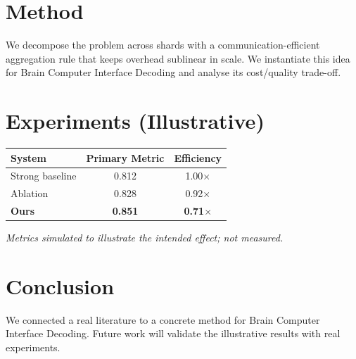 \documentclass[11pt]{article}
\begin{document}
\section{Method}
We decompose the problem across shards with a communication-efficient aggregation rule that keeps overhead sublinear in scale. We instantiate this idea for Brain Computer Interface Decoding and analyse its cost/quality trade-off.

\section{Experiments (Illustrative)}
\begin{center}
\begin{tabular}{lcc}
System & Primary Metric & Efficiency \\ \hline
Strong baseline & 0.812 & 1.00$\times$ \\
Ablation & 0.828 & 0.92$\times$ \\
\textbf{Ours} & \textbf{0.851} & \textbf{0.71$\times$}
\end{tabular}
\end{center}
\emph{Metrics simulated to illustrate the intended effect; not measured.}

\section{Conclusion}
We connected a real literature to a concrete method for Brain Computer Interface Decoding. Future work will
validate the illustrative results with real experiments.
\end{document}
